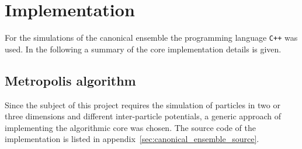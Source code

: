 \documentclass[11pt, a4paper]{article}
\numberwithin{equation}{section}
\begin{document}
\section{Implementation}
For the simulations of the canonical ensemble the programming language \texttt{C++} was used.
In the following a summary of the core implementation details is given.

\subsection{Metropolis algorithm} \label{sec:Metropolis_alg}
Since the subject of this project requires the simulation of particles in two or three dimensions and different inter-particle potentials, a generic approach of implementing the algorithmic core was chosen.
The source code of the implementation is listed in appendix~\ref{sec:canonical_ensemble_source}.
\end{document}

